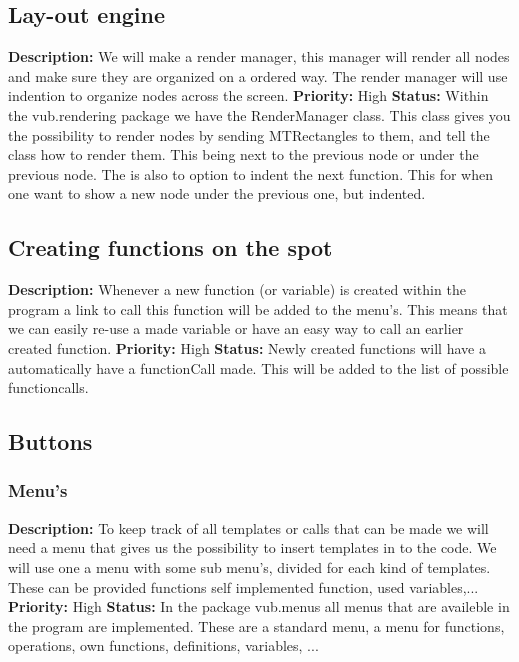 \documentclass[a4paper,12pt]{report}
\begin{document}
\subsection{Lay-out engine}
\textbf{Description: } We will make a render manager, this manager will render all nodes and make sure they are organized on a ordered way. The render manager will use
indention to organize nodes across the screen.
\textbf{Priority:} High \newline
\textbf{Status: } Within the vub.rendering package we have the RenderManager class. This class gives you the possibility to render nodes
by sending MTRectangles to them, and tell the class how to render them. This being next to the previous node or under the previous node. 
The is also to option to indent the next function. This for when one want to show a new node under the previous one, but indented. \newline
\subsection{Creating functions on the spot}
\textbf{Description: } Whenever a new function (or variable) is created within the program a link to call this function will be added to the menu's. This means that we can
easily re-use a made variable or have an easy way to call an earlier created function. \newline
\textbf{Priority:} High \newline
\textbf{Status: } Newly created functions will have a automatically have a functionCall made. This will be added to the list of possible
functioncalls.\newline
\subsection{Buttons}
\subsubsection{Menu's}
\textbf{Description: } To keep track of all templates or calls that can be made we will need a menu that gives us the possibility to insert templates in to the code.
We will use one a menu with some sub menu's, divided for each kind of templates. These can be provided functions self implemented function, used variables,... \newline
\textbf{Priority:} High \newline
\textbf{Status: } In the package vub.menus all menus that are availeble in the program are implemented. These are a standard menu, a menu for functions, operations, own functions, definitions, variables, ...\newline
\end{document}
